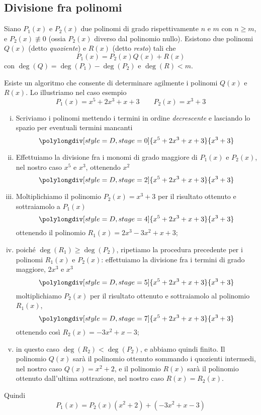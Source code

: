 \subsection{Divisione fra polinomi}
\begin{theorem}
    \label{th:1.1}
    Siano $P_1(x)$ e $P_2(x)$ due polinomi di grado rispettivamente $n$ e $m$ con $n\ge m$, e $P_2(x)\not\equiv 0$ (ossia $P_2(x)$ diverso dal polinomio nullo). Esistono due polinomi $Q(x)$ (detto \emph{quoziente}) e $R(x)$ (detto \emph{resto}) tali che
    \[
    P_1(x) = P_2(x)Q(x)+R(x)
    \]
    con $\deg(Q) = \deg(P_1)-\deg(P_2)$ e $\deg(R)<m$.
\end{theorem}
\begin{example}
    Esiste un algoritmo che consente di determinare agilmente i polinomi $Q(x)$ e $R(x)$. Lo illustriamo nel caso esempio
    \[
    P_1(x) = x^5+2x^3+x+3 \qquad P_2(x) = x^3+3
    \]
    \begin{enumerate}[(i)]
        \item Scriviamo i polinomi mettendo i termini in ordine \emph{decrescente} e lasciando lo spazio per eventuali termini mancanti
        \[
        \polylongdiv[style=D, stage=0]{x^5+2x^3+x+3}{x^3+3}
        \]
        \item Effettuiamo la divisione fra i monomi di grado maggiore di $P_1(x)$ e $P_2(x)$, nel nostro caso $x^5$ e $x^3$, ottenendo $x^2$
        \[
        \polylongdiv[style=D, stage=2]{x^5+2x^3+x+3}{x^3+3}
        \]
        \item Moltiplichiamo il polinomio $P_2(x) = x^3+3$ per il risultato ottenuto e sottraiamolo a $P_1(x)$
        \[
        \polylongdiv[style=D,stage=4]{x^5+2x^3+x+3}{x^3+3}
        \]
        ottenendo il polinomio $R_1(x) = 2x^3-3x^2+x+3$;
        \item poiché $\deg(R_1)\ge \deg(P_2)$, ripetiamo la procedura precedente per i polinomi $R_1(x)$ e $P_2(x)$: effettuiamo la divisione fra i termini di grado maggiore, $2x^3$ e $x^3$
        \[
        \polylongdiv[style=D,stage=5]{x^5+2x^3+x+3}{x^3+3}
        \]
        moltiplichiamo $P_2(x)$ per il risultato ottenuto e sottraiamolo al polinomio $R_1(x)$, 
        \[
        \polylongdiv[style=D,stage=7]{x^5+2x^3+x+3}{x^3+3}
        \]
        ottenendo così $R_2(x) = -3x^2+x-3$;
        \item in questo caso $\deg(R_2)<\deg(P_2)$, e abbiamo quindi finito. Il polinomio $Q(x)$ sarà il polinomio ottenuto sommando i quozienti intermedi, nel nostro caso $Q(x) = x^2+2$, e il polinomio $R(x)$ sarà il polinomio ottenuto dall'ultima sottrazione, nel nostro caso $R(x)= R_2(x)$.
    \end{enumerate}
    Quindi 
    \[
    P_1(x) = P_2(x)(x^2+2)+(-3x^2+x-3)
    \]
\end{example}
